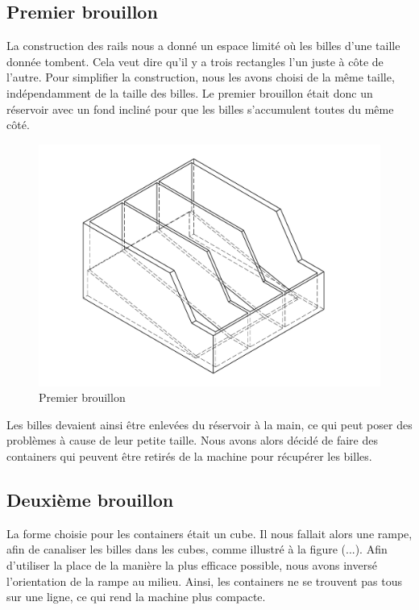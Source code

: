 \subsection{Premier brouillon}
La construction des rails nous a donné un espace limité où les billes d'une taille donnée tombent. Cela veut dire qu'il y a trois rectangles l'un juste à côte de l'autre. Pour simplifier la construction, nous les avons choisi de la même taille, indépendamment de la taille des billes. Le premier brouillon était donc un réservoir avec un fond incliné pour que les billes s'accumulent toutes du même côté.

\begin{figure}
    \centering
    \includegraphics[width=\textwidth]{Graphics/Reservoir_final/PREMIER_BROUILLON.pdf}
    \caption{Premier brouillon}
\end{figure}

Les billes devaient ainsi être enlevées du réservoir à la main, ce qui peut poser des problèmes à cause de leur petite taille. Nous avons alors décidé de faire des containers qui peuvent être retirés de la machine pour récupérer les billes. 

\subsection{Deuxième brouillon}
La forme choisie pour les containers était un cube. Il nous fallait alors une rampe, afin de canaliser les billes dans les cubes, comme illustré à la figure  (...). Afin d'utiliser la place de la manière la plus efficace possible, nous avons inversé l'orientation de la rampe au milieu. Ainsi, les containers ne se trouvent pas tous sur une ligne, ce qui rend la machine plus compacte. 

